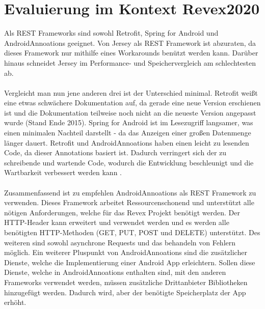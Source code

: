 \section{Evaluierung im Kontext Revex2020}
Als REST Frameworks sind sowohl Retrofit, Spring for Android und AndroidAnnoations geeignet. Von Jersey als REST Framework ist abzuraten, da dieses Framework nur mithilfe eines Workarounds benützt werden kann. Darüber hinaus schneidet Jersey im Performance- und Speichervergleich am schlechtesten ab.
\\\\
Vergleicht man nun jene anderen drei ist der Unterschied minimal. Retrofit weißt eine etwas schwächere Dokumentation auf, da gerade eine neue Version erschienen ist und die Dokumentation teilweise noch nicht an die neueste Version angepasst wurde (Stand Ende 2015). Spring for Android ist im Lesezugriff langsamer, was einen minimalen Nachteil darstellt - da das Anzeigen einer großen Datenmenge länger dauert. Retrofit und AndroidAnnoations haben einen leicht zu lesenden Code, da dieser Annotations basiert ist. Dadurch verringert sich der zu schreibende und wartende Code, wodurch die Entwicklung beschleunigt und die Wartbarkeit verbessert werden kann \cite{cleanCode}.
\\\\
Zusammenfassend ist zu empfehlen AndroidAnnoations als REST Framework zu verwenden. Dieses Framework arbeitet Ressourcenschonend und unterstützt alle nötigen Anforderungen, welche für das Revex Projekt benötigt werden. Der HTTP-Header kann erweitert und verwendet werden und es werden alle benötigten HTTP-Methoden (GET, PUT, POST und DELETE) unterstützt. Des weiteren sind sowohl asynchrone Requests und das behandeln von Fehlern möglich. Ein weiterer Pluspunkt von AndroidAnnoations sind die zusätzlicher Dienste, welche die Implementierung einer Android App erleichtern. Sollen diese Dienste, welche in AndroidAnnoations enthalten sind, mit den anderen Frameworks verwendet werden, müssen zusätzliche Drittanbieter Bibliotheken hinzugefügt werden. Dadurch wird, aber der benötigte Speicherplatz der App erhöht.

